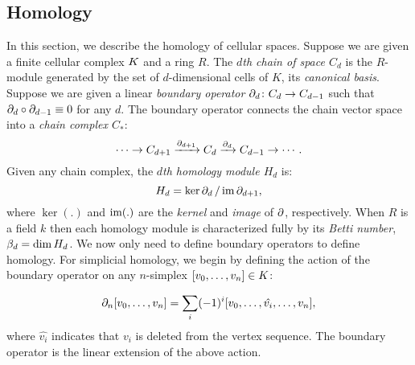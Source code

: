 \subsection{Homology}
In this section, we describe the homology of cellular spaces. 
Suppose we are given a finite cellular complex $K$ and a ring $R$. 
The \emph{$d$th chain of space $C_d$} is the $R$-module generated by 
the set of $d$-dimensional cells of $K$, its \emph{canonical basis}.  
Suppose we are given a linear \emph{boundary operator} 
$\partial_d\colon C_d \rightarrow C_{d-1}$ such that 
$\partial_d \circ \partial_{d-1} \equiv 0$ for any $d$.  
The boundary operator connects the chain vector space into a 
\emph{chain complex $C_*$}:
\begin{equation*}
  \cdots \rightarrow             C_{d+1}
         \xrightarrow{\partial_{d+1}}  C_d
         \xrightarrow{\partial_d}     C_{d-1}
         \rightarrow \cdots .
\label{eqn:chaincomplex}
\end{equation*}
Given any chain complex, the \emph{$d$th homology module $H_d$} is:
\begin{equation}
  \label{eqn:homology}
  H_d = {\ker{\ensuremath{\partial}_d}}\,/\,{\operatorname{im}{\partial_{d+1}}}, 
\end{equation}
where $\ker(.)$ and $\operatorname{im}(.)$ are the \emph{kernel} and \emph{image} of $\partial$, 
respectively.
When $R$ is a field $k$ then each homology module is characterized fully by its \emph{Betti number}, 
$\beta_d = \dim{H_d}$. 
We now only need to define boundary operators to define homology. 
For simplicial homology, we begin by defining the action of the boundary operator on any
$n$-simplex $[v_0,\ldots,v_n] \in K$:

\begin{equation*}
\partial_n [v_0,\ldots,v_n] = \sum_i (-1)^i [v_0,\ldots,\hat{v_i},\ldots,v_n],
\end{equation*}
where $\hat{v_i}$ indicates that $v_i$ is deleted from the vertex 
sequence. The boundary operator is the linear extension of the above action.

